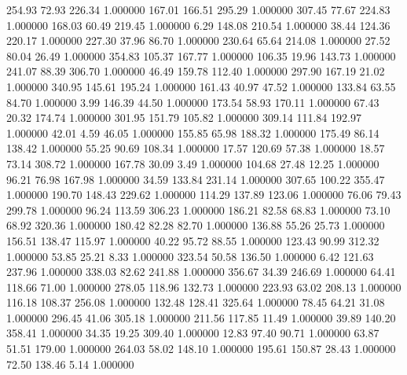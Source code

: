     254.93     72.93    226.34  1.000000
    167.01    166.51    295.29  1.000000
    307.45     77.67    224.83  1.000000
    168.03     60.49    219.45  1.000000
      6.29    148.08    210.54  1.000000
     38.44    124.36    220.17  1.000000
    227.30     37.96     86.70  1.000000
    230.64     65.64    214.08  1.000000
     27.52     80.04     26.49  1.000000
    354.83    105.37    167.77  1.000000
    106.35     19.96    143.73  1.000000
    241.07     88.39    306.70  1.000000
     46.49    159.78    112.40  1.000000
    297.90    167.19     21.02  1.000000
    340.95    145.61    195.24  1.000000
    161.43     40.97     47.52  1.000000
    133.84     63.55     84.70  1.000000
      3.99    146.39     44.50  1.000000
    173.54     58.93    170.11  1.000000
     67.43     20.32    174.74  1.000000
    301.95    151.79    105.82  1.000000
    309.14    111.84    192.97  1.000000
     42.01      4.59     46.05  1.000000
    155.85     65.98    188.32  1.000000
    175.49     86.14    138.42  1.000000
     55.25     90.69    108.34  1.000000
     17.57    120.69     57.38  1.000000
     18.57     73.14    308.72  1.000000
    167.78     30.09      3.49  1.000000
    104.68     27.48     12.25  1.000000
     96.21     76.98    167.98  1.000000
     34.59    133.84    231.14  1.000000
    307.65    100.22    355.47  1.000000
    190.70    148.43    229.62  1.000000
    114.29    137.89    123.06  1.000000
     76.06     79.43    299.78  1.000000
     96.24    113.59    306.23  1.000000
    186.21     82.58     68.83  1.000000
     73.10     68.92    320.36  1.000000
    180.42     82.28     82.70  1.000000
    136.88     55.26     25.73  1.000000
    156.51    138.47    115.97  1.000000
     40.22     95.72     88.55  1.000000
    123.43     90.99    312.32  1.000000
     53.85     25.21      8.33  1.000000
    323.54     50.58    136.50  1.000000
      6.42    121.63    237.96  1.000000
    338.03     82.62    241.88  1.000000
    356.67     34.39    246.69  1.000000
     64.41    118.66     71.00  1.000000
    278.05    118.96    132.73  1.000000
    223.93     63.02    208.13  1.000000
    116.18    108.37    256.08  1.000000
    132.48    128.41    325.64  1.000000
     78.45     64.21     31.08  1.000000
    296.45     41.06    305.18  1.000000
    211.56    117.85     11.49  1.000000
     39.89    140.20    358.41  1.000000
     34.35     19.25    309.40  1.000000
     12.83     97.40     90.71  1.000000
     63.87     51.51    179.00  1.000000
    264.03     58.02    148.10  1.000000
    195.61    150.87     28.43  1.000000
     72.50    138.46      5.14  1.000000
